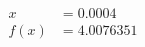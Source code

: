 \documentclass[preview]{standalone}
\begin{document}
\begin{align*}
x &= 0.0004\\f(x) &= 4.0076351
\end{align*}
\end{document}
